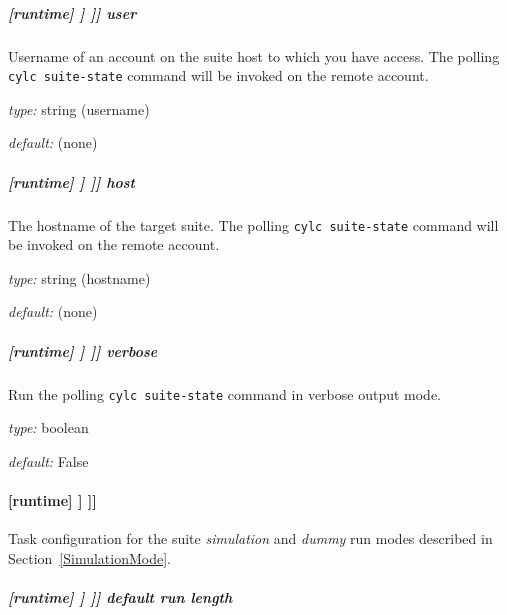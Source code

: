 \subparagraph[user]{[runtime] \textrightarrow [[\_\_NAME\_\_]] \textrightarrow [[[suite state polling]]] \textrightarrow user}

Username of an account on the suite host to which you have access. The
polling \lstinline=cylc suite-state= command will be invoked
on the remote account.

\begin{myitemize}
    \item {\em type:} string (username)
    \item {\em default:} (none)
\end{myitemize}

\subparagraph[host]{[runtime] \textrightarrow [[\_\_NAME\_\_]] \textrightarrow [[[suite state polling]]] \textrightarrow host}

The hostname of the target suite. The polling \lstinline=cylc suite-state= command
will be invoked on the remote account.

\begin{myitemize}
    \item {\em type:} string (hostname)
    \item {\em default:} (none)
\end{myitemize}

\subparagraph[verbose]{[runtime] \textrightarrow [[\_\_NAME\_\_]] \textrightarrow [[[suite state polling]]] \textrightarrow verbose}

Run the polling \lstinline=cylc suite-state= command in verbose output mode.

\begin{myitemize}
    \item {\em type:} boolean
    \item {\em default:} False
\end{myitemize}

\paragraph[{[[[}simulation{]]]}]{[runtime] \textrightarrow [[\_\_NAME\_\_]] \textrightarrow [[[simulation]]]}
\label{suiterc-sim-config}

\lstset{language=transcript}

Task configuration for the suite {\em simulation} and {\em dummy} run modes
described in Section~\ref{SimulationMode}.

\subparagraph[default run length]{[runtime] \textrightarrow [[\_\_NAME\_\_]] \textrightarrow [[[simulation]]] \textrightarrow default run length}

